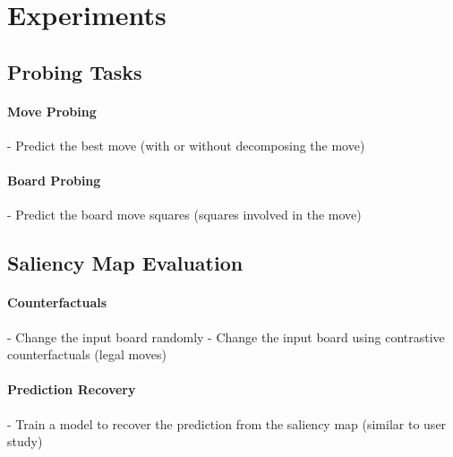 \section{Experiments}

\subsection{Probing Tasks}
\paragraph{Move Probing}
- Predict the best move (with or without decomposing the move)
\paragraph{Board Probing}
- Predict the board move squares (squares involved in the move)


\subsection{Saliency Map Evaluation}
\paragraph{Counterfactuals}
- Change the input board randomly
- Change the input board using contrastive counterfactuals (legal moves)
\paragraph{Prediction Recovery}
- Train a model to recover the prediction from the saliency map (similar to user study)
